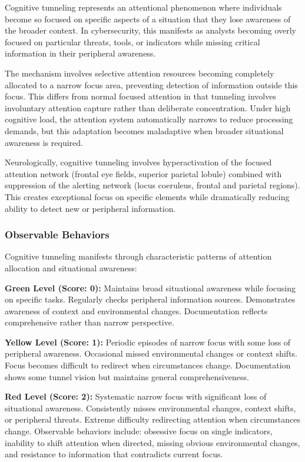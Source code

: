 \documentclass[11pt,a4paper]{article}
\begin{document}
Cognitive tunneling represents an attentional phenomenon where individuals become so focused on specific aspects of a situation that they lose awareness of the broader context\cite{wickens2015}. In cybersecurity, this manifests as analysts becoming overly focused on particular threats, tools, or indicators while missing critical information in their peripheral awareness.

The mechanism involves selective attention resources becoming completely allocated to a narrow focus area, preventing detection of information outside this focus\cite{lavie2005}. This differs from normal focused attention in that tunneling involves involuntary attention capture rather than deliberate concentration. Under high cognitive load, the attention system automatically narrows to reduce processing demands, but this adaptation becomes maladaptive when broader situational awareness is required.

Neurologically, cognitive tunneling involves hyperactivation of the focused attention network (frontal eye fields, superior parietal lobule) combined with suppression of the alerting network (locus coeruleus, frontal and parietal regions)\cite{posner2007}. This creates exceptional focus on specific elements while dramatically reducing ability to detect new or peripheral information.

\subsubsection{Observable Behaviors}

Cognitive tunneling manifests through characteristic patterns of attention allocation and situational awareness:

\textbf{Green Level (Score: 0):} Maintains broad situational awareness while focusing on specific tasks. Regularly checks peripheral information sources. Demonstrates awareness of context and environmental changes. Documentation reflects comprehensive rather than narrow perspective.

\textbf{Yellow Level (Score: 1):} Periodic episodes of narrow focus with some loss of peripheral awareness. Occasional missed environmental changes or context shifts. Focus becomes difficult to redirect when circumstances change. Documentation shows some tunnel vision but maintains general comprehensiveness.

\textbf{Red Level (Score: 2):} Systematic narrow focus with significant loss of situational awareness. Consistently misses environmental changes, context shifts, or peripheral threats. Extreme difficulty redirecting attention when circumstances change. Observable behaviors include: obsessive focus on single indicators, inability to shift attention when directed, missing obvious environmental changes, and resistance to information that contradicts current focus.
\end{document}

